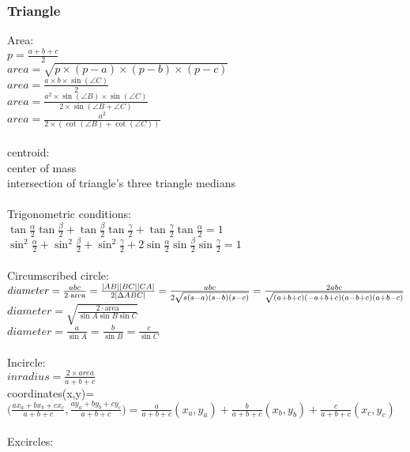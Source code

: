 \subsubsection{Triangle}
Area:\\
$p=\frac{a+b+c}{2}$\\
$area=\sqrt{p\times (p-a)\times (p-b)\times (p-c)}$\\
$area=\frac{a\times b\times \sin(\angle C)}{2}$\\
$area=\frac{a^2\times \sin(\angle B)\times \sin(\angle C)}{2\times \sin(\angle B+\angle C)}$\\
$area=\frac{a^2}{2\times (\cot(\angle B)+\cot(\angle C))}$\\
\\
centroid:\\
    center of mass\\
    intersection of triangle's three triangle medians\\
\\
Trigonometric conditions:\\
$\tan{\frac{\alpha}{2}}\tan{\frac{\beta}{2}}+\tan{\frac{\beta}{2}}\tan{\frac{\gamma}{2}}+\tan{\frac{\gamma}{2}}\tan{\frac{\alpha}{2}}=1$\\
$\sin^2{\frac{\alpha}{2}}+\sin^2{\frac{\beta}{2}}+\sin^2{\frac{\gamma}{2}}+2\sin{\frac{\alpha}{2}}\sin{\frac{\beta}{2}}\sin{\frac{\gamma}{2}}=1$\\
\\
Circumscribed circle:\\
$diameter = \frac{abc}{2\cdot\text{area}} = \frac{|AB| |BC| |CA|}{2|\Delta ABC|} \\\\
         = \frac{abc}{2\sqrt{s(s-a)(s-b)(s-c)}}\\\\
         = \frac{2abc}{\sqrt{(a+b+c)(-a+b+c)(a-b+c)(a+b-c)}}$\\
$diameter=\sqrt{\frac{2 \cdot \text{area}}{\sin A \sin B \sin C}}$\\
$diameter=\frac{a}{\sin A}=\frac{b}{\sin B}=\frac{c}{\sin C}$\\
\\
Incircle:\\
$inradius=\frac{2\times area}{a+b+c}$\\
coordinates(x,y)=$\bigg(\frac{a x_a+b x_b+c x_c}{a+b+c},\frac{a y_a+b y_b+c y_c}{a+b+c}\bigg) = \frac{a}{a+b+c}(x_a,y_a)+\frac{b}{a+b+c}(x_b,y_b)+\frac{c}{a+b+c}(x_c,y_c)$\\
\\
Excircles:\\
